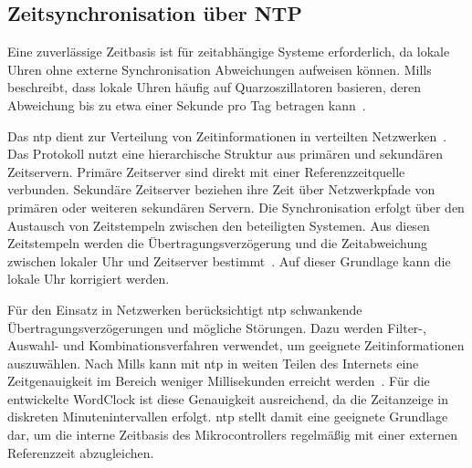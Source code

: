 \subsection{Zeitsynchronisation über NTP}
Eine zuverlässige Zeitbasis ist für zeitabhängige Systeme erforderlich, da lokale Uhren ohne externe Synchronisation Abweichungen aufweisen können.
Mills beschreibt, dass lokale Uhren häufig auf Quarzoszillatoren basieren, deren Abweichung bis zu etwa einer Sekunde pro Tag betragen kann~\cite{mills1991ntp}.

Das \gls{ntp} dient zur Verteilung von Zeitinformationen in verteilten Netzwerken~\cite{mills1991ntp}.
Das Protokoll nutzt eine hierarchische Struktur aus primären und sekundären Zeitservern.
Primäre Zeitserver sind direkt mit einer Referenzzeitquelle verbunden.
Sekundäre Zeitserver beziehen ihre Zeit über Netzwerkpfade von primären oder weiteren sekundären Servern.
Die Synchronisation erfolgt über den Austausch von Zeitstempeln zwischen den beteiligten Systemen.
Aus diesen Zeitstempeln werden die Übertragungsverzögerung und die Zeitabweichung zwischen lokaler Uhr und Zeitserver bestimmt~\cite{mills1991ntp}.
Auf dieser Grundlage kann die lokale Uhr korrigiert werden.

Für den Einsatz in Netzwerken berücksichtigt \gls{ntp} schwankende Übertragungsverzögerungen und mögliche Störungen.
Dazu werden Filter-, Auswahl- und Kombinationsverfahren verwendet, um geeignete Zeitinformationen auszuwählen.
Nach Mills kann mit \gls{ntp} in weiten Teilen des Internets eine Zeitgenauigkeit im Bereich weniger Millisekunden erreicht werden~\cite{mills1991ntp}.
Für die entwickelte WordClock ist diese Genauigkeit ausreichend, da die Zeitanzeige in diskreten Minutenintervallen erfolgt.
\gls{ntp} stellt damit eine geeignete Grundlage dar, um die interne Zeitbasis des Mikrocontrollers regelmäßig mit einer externen Referenzzeit abzugleichen.